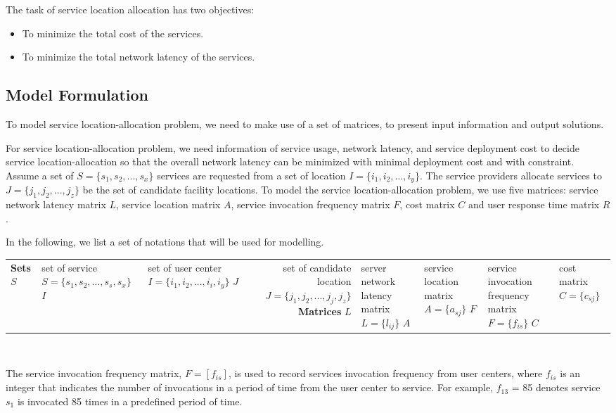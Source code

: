 \documentclass{llncs}
\begin{document}
The task of service location allocation has two objectives:
\begin{itemize}
	\item To minimize the total cost of the services.
	\item To minimize the total network latency of the services.
\end{itemize}


\subsection{Model Formulation}
To model service location-allocation problem, we need to make use of a set of matrices, to present input information and output solutions. 

For service location-allocation problem, we need information of service usage, network latency, and service deployment cost to decide service location-allocation so that the overall network latency can be minimized with minimal deployment cost and with constraint.
Assume a set of $S = \{ s_{1}, s_{2}, ..., s_{x}\}$ services are
requested from a set of location $I = \{ i_{1}, i_{2}, ..., i_{y} \}$. The service providers allocate services 
to $J = \{ j_{1}, j_{2}, ..., j_{z} \}$ be the set of candidate facility locations.
To model the service location-allocation problem, we use five matrices: 
service network latency matrix $L$, service location
matrix $A$, service invocation frequency matrix $F$, cost matrix $C$ and user response time matrix $R$.

In the following, we list a set of notations that will be used for modelling. 
{
\centering
	\begin{tabular}{l*{2}{l}r}
		\hline
		\textbf{Sets} \cr
		$S$	& set of service $S = \{s_{1}, s_{2}, ..., s_{s}, s_{x}\}$ \cr
		$I$	& set of user center $I = \{i_{1}, i_{2}, ..., i_{i}, i_{y}\}$ \cr
		$J$	& set of candidate location $J = \{j_{1}, j_{2}, ..., j_{j}, j_{z}\}$ \cr
		\textbf{Matrices} \cr
		$L$ & server network latency matrix $L = \{l_{ij}\}$ \cr
		$A$ & service location matrix $A = \{a_{sj}\}$ \cr
		$F$ & service invocation frequency matrix $F = \{f_{is}\}$ \cr
		$C$ & cost matrix $C = \{c_{sj}\}$ \cr
		\hline
	\end{tabular}
\\
}
The service invocation frequency matrix, $F= [f_{is}]$, is used to record services invocation frequency from user centers, 
where $f_{is}$ is an integer that indicates the number of invocations in a period of time from the user center to service. 
For example, $f_{13}$ = 85 denotes service $s_{1}$ is invocated 85 times in a predefined period of time.
\end{document}
